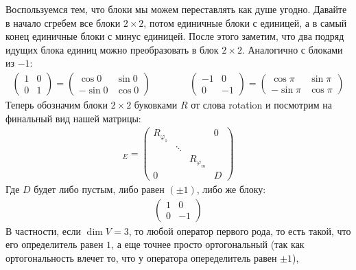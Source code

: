 \begin{enumerate}
    Воспользуемся тем, что блоки мы можем переставлять как душе угодно. Давайте в начало сгребем все блоки $2 \times 2$, потом единичные блоки 
    с единицей, а в самый конец единичные блоки с минус единицей. После этого 
    заметим, что два подряд идущих блока единиц можно преобразовать в блок $2 \times 2$. Аналогично с блоками из $-1$: 
    \begin{gather*}
        \left(\begin{array}{cc}
            1 & 0 \\ 
            0 & 1
        \end{array}\right) = \left(\begin{array}{cc}
            \cos{0} & \sin{0} \\ 
            -\sin{0} & \cos{0}
        \end{array}\right) \qquad \qquad
        \left(\begin{array}{cc}
            -1 & 0 \\
            0 & -1
        \end{array}\right) = \left(\begin{array}{cc}
            \cos{\pi} & \sin{\pi} \\
            -\sin{\pi} & \cos{\pi}
        \end{array}\right)
    \end{gather*}
    Теперь обозначим блоки $2 \times 2$ буковками $R$ от слова rotation и посмотрим на финальный вид нашей матрицы: 
    \begin{gather*}
        [\A]_{E} = \left(\begin{array}{cccc}
            R_{\varphi_1} &  &  & 0 \\ 
            & \ddots &  &  \\ 
            &  & R_{\varphi_m} &  \\ 
            0 &  &  & D
        \end{array}\right)
    \end{gather*}
    Где $D$ будет либо пустым, либо равен $(\pm 1)$, либо же блоку:
    \begin{gather*}
        \left(\begin{array}{cc}
            1 & 0 \\ 
            0 & -1
        \end{array}\right)
    \end{gather*}
    В частности, если $\dim V = 3$, то любой оператор первого рода, то есть такой, что его определитель равен $1$, а еще точнее просто ортогональный 
    (так как ортогональность влечет то, что у оператора опеределитель равен $\pm 1$), 

\end{enumerate}
